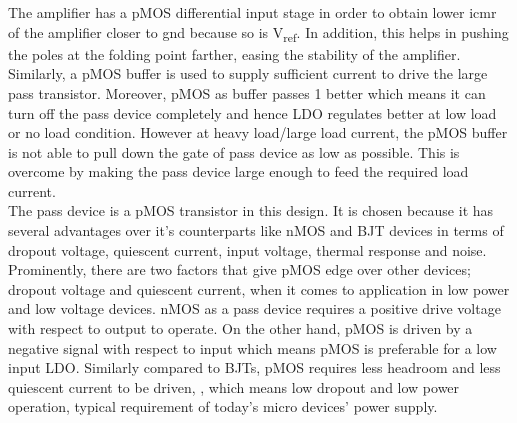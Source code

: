 \documentclass[12pt,a4paper,UKenglish]{article}
\begin{document}
The amplifier has a pMOS differential input stage in order to obtain lower \acrshort{icmr} of the amplifier closer to gnd because so is V\textsubscript{ref}. In addition, this helps in pushing the poles at the folding point farther, easing the stability of the amplifier\cite[pp. 304-305]{razavi_2001}. Similarly, a pMOS buffer is used to supply sufficient current to drive the large pass transistor.  Moreover, pMOS as buffer passes 1 better which means it can turn off the pass device completely and hence LDO regulates better at low load or no load condition. However at heavy load/large load current, the pMOS buffer is not able to pull down the gate of pass device as low as possible.  This is overcome by making the pass device large enough to feed the required load current.\\

The pass device is a pMOS transistor in this design. It is chosen because it has several advantages over it's counterparts like nMOS and BJT devices in terms of dropout voltage, quiescent current, input voltage, thermal response and noise\cite{ldo_ti_pmos}. Prominently, there are two factors that give pMOS edge over other devices; dropout voltage and quiescent current, when it comes to application in low power and low voltage devices. nMOS as a pass device requires a positive drive voltage with respect to output to operate. On the other hand, pMOS is driven by a negative signal with respect to input which means pMOS is preferable for a low input LDO. Similarly compared to BJTs, pMOS requires less headroom and less quiescent current to be driven\cite{ldo_ti_pmos}, \cite{ldo_ti_stability}, which means low dropout and low power operation, typical requirement of today's micro devices' power supply. \\
\end{document}
